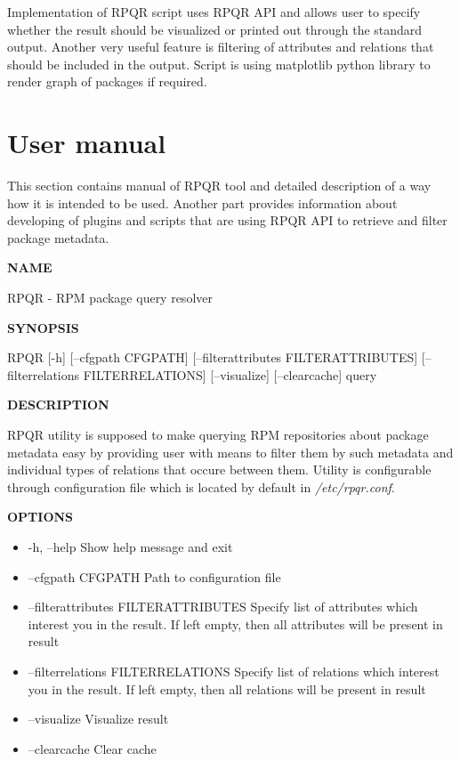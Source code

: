 Implementation of RPQR script uses RPQR API and allows user to specify whether the result should be
visualized or printed out through the standard output. Another very useful feature is filtering of
attributes and relations that should be included in the output. Script is using matplotlib python
library to render graph of packages if required.

\section{User manual}
This section contains manual of RPQR tool and detailed description of a way how it is intended to be
used. Another part provides information about developing of plugins and scripts that are using RPQR
API to retrieve and filter package metadata.

\textbf{NAME}

RPQR - RPM package query resolver

\textbf{SYNOPSIS}

RPQR [-h] [--cfgpath CFGPATH] [--filterattributes FILTERATTRIBUTES] [--filterrelations FILTERRELATIONS]
[--visualize] [--clearcache]
query

\textbf{DESCRIPTION}

RPQR utility is supposed to make querying RPM repositories about package metadata easy by providing
user with means to filter them by such metadata and individual types of relations that occure between
them. Utility is configurable through configuration file which is located by default in \textit{/etc/rpqr.conf}.

\textbf{OPTIONS}

\begin{itemize}
  \item -h, --help
    \subitem Show help message and exit
  \item --cfgpath CFGPATH
    \subitem Path to configuration file
  \item --filterattributes FILTERATTRIBUTES
    \subitem Specify list of attributes which interest you in the result. If left empty, then all attributes will be present in result
  \item --filterrelations FILTERRELATIONS
    \subitem Specify list of relations which interest you in the result. If left empty, then all relations will be present in result
  \item --visualize
    \subitem Visualize result
  \item --clearcache
    \subitem Clear cache
\end{itemize}

